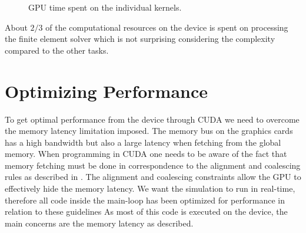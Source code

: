 \begin{figure}
  \centering
  \caption{GPU time spent on the individual kernels.}
  \label{fig:cuda-pie}
\end{figure}

About $2/3$ of the computational resources on the device is spent on
processing the finite element solver which is not surprising considering the
complexity compared to the other tasks.
%

\section{Optimizing Performance}
To get optimal performance from the device through CUDA we need to
overcome the memory latency limitation imposed. The memory bus on
the graphics cards has a high bandwidth but also a large latency when
fetching from the global memory. When programming in CUDA one needs to be
aware of the fact that memory fetching must be done in correspondence
to the alignment and coalescing rules as described in
. The alignment and coalescing constraints
allow the GPU to effectively hide the memory latency.
%
We want the simulation to run in real-time, therefore all code inside
the main-loop has been optimized for performance in relation to these
guidelines As most of this code is executed on the device, the main
concerns are the memory latency as described.

